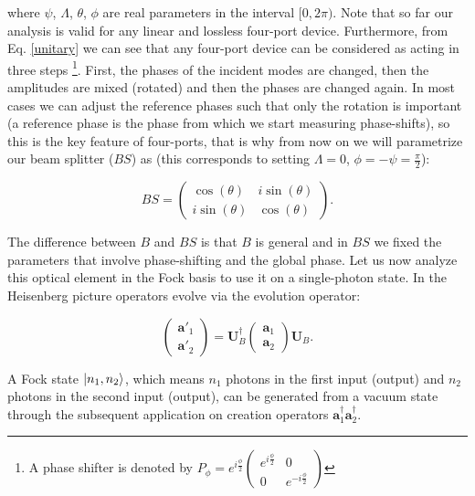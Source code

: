 \documentclass[12pt]{book}
\begin{document}
where $\psi$, $\Lambda$, $\theta$, $\phi$ are real parameters in the interval $[0,2\pi)$. Note that so far our analysis is valid for any linear and lossless four-port device. Furthermore, from Eq. \ref{unitary} we can see that any four-port device can be considered as acting in three steps \footnote{A phase shifter is denoted by $P_{\phi}=e^{i \frac{\phi}{2}}\begin{pmatrix}e^{i \frac{\phi}{2}} & 0 \\0 & e^{-i \frac{\phi}{2}} \end{pmatrix}$}. First, the phases of the incident modes are changed, then the amplitudes are mixed (rotated) and then the phases are changed again. In most cases we can adjust the reference phases such that only the rotation is important (a reference phase is the phase from which we start measuring phase-shifts), so this is the key feature of four-ports, that is why from now on we will parametrize our beam splitter ($BS$) as (this corresponds to  setting $\Lambda=0$, $\phi=-\psi=\frac{\pi}{2}$):


\begin{equation}
BS=\begin{pmatrix} \cos(\theta) & i \sin(\theta) \\ i \sin(\theta) & \cos(\theta) \end{pmatrix}.\label{BS_matrix}
\end{equation}


The difference between $B$ and $BS$ is that $B$ is general and in $BS$ we fixed the parameters that involve phase-shifting and the global phase. Let us now analyze this optical element in the Fock basis  to use it on a single-photon state. In the Heisenberg picture operators evolve via the evolution operator:

\begin{equation}
\begin{pmatrix} \mathbf{a}'_{1} \\ \mathbf{a}'_{2}\end{pmatrix}=\mathbf{U}^{\dagger}_{B} \begin{pmatrix} \mathbf{a}_{1} \\ \mathbf{a}_{2}\end{pmatrix} \mathbf{U}_{B}.
\label{Heisenberg}
\end{equation}

A Fock state $\ket{n_{1},n_{2}}$, which means $n_{1}$ photons in the first input (output) and $n_{2}$ photons in the second input (output), can be generated from a vacuum state through the subsequent application on creation operators  $\mathbf{a}^{\dagger}_{1}\mathbf{a}^{\dagger}_{2}$. 
\end{document}
